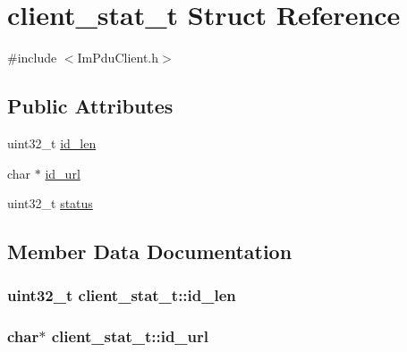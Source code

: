 \hypertarget{structclient__stat__t}{}\section{client\+\_\+stat\+\_\+t Struct Reference}
\label{structclient__stat__t}


{\ttfamily \#include $<$Im\+Pdu\+Client.\+h$>$}

\subsection*{Public Attributes}
\begin{DoxyCompactItemize}
\item 
uint32\+\_\+t \hyperlink{structclient__stat__t_af373b2cf97127641d2025c654d090d0c}{id\+\_\+len}
\item 
char $\ast$ \hyperlink{structclient__stat__t_addbba8759f386da178135dd5401eb9f7}{id\+\_\+url}
\item 
uint32\+\_\+t \hyperlink{structclient__stat__t_a5bec1e511cae234576ca323a25d5e4c4}{status}
\end{DoxyCompactItemize}


\subsection{Member Data Documentation}
\hypertarget{structclient__stat__t_af373b2cf97127641d2025c654d090d0c}{}
\subsubsection[{id\+\_\+len}]{\setlength{\rightskip}{0pt plus 5cm}uint32\+\_\+t client\+\_\+stat\+\_\+t\+::id\+\_\+len}\label{structclient__stat__t_af373b2cf97127641d2025c654d090d0c}
\hypertarget{structclient__stat__t_addbba8759f386da178135dd5401eb9f7}{}
\subsubsection[{id\+\_\+url}]{\setlength{\rightskip}{0pt plus 5cm}char$\ast$ client\+\_\+stat\+\_\+t\+::id\+\_\+url}\label{structclient__stat__t_addbba8759f386da178135dd5401eb9f7}
\hypertarget{structclient__stat__t_a5bec1e511cae234576ca323a25d5e4c4}{}
